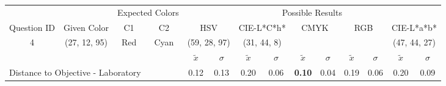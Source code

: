 \begin{table}[H]
  \resizebox{\textwidth}{!} {
  \begin{tabular}{lccccccccccccc}
    \hline
    \multicolumn{1}{c}{}                              &                                      & \multicolumn{2}{c}{Expected Colors}                   & \multicolumn{10}{c}{Possible Results}                                                                                                                                                                                                                                                                                        \\ \cline{3-14}
    \multicolumn{1}{c}{\multirow{-2}{*}{Question ID}} & \multirow{-2}{*}{Given Color}        & C1                       & C2                         & \multicolumn{2}{c}{HSV}                                        & \multicolumn{2}{c}{CIE-L*C*h*}                                 & \multicolumn{2}{c}{CMYK}                                       & \multicolumn{2}{c}{RGB}                                        & \multicolumn{2}{c}{CIE-L*a*b*}                                 \\ \hline
    \multicolumn{1}{c}{4}                             & \cellcolor[HTML]{7F00FF}(27, 12, 95) & \multicolumn{1}{c|}{Red} & \multicolumn{1}{c|}{Cyan}  & \multicolumn{2}{c|}{\cellcolor[HTML]{FF00FF}(59, 28, 97)}      & \multicolumn{2}{c|}{\cellcolor[HTML]{91C01D}(31, 44, 8)}       & \multicolumn{2}{c|}{\cellcolor[HTML]{808080}{\color[HTML]{FFFFFF}(21, 22, 24)}}       & \multicolumn{2}{c|}{\cellcolor[HTML]{808080}{\color[HTML]{FFFFFF}(21, 22, 24)}}       & \multicolumn{2}{c|}{\cellcolor[HTML]{DDA581}(47, 44, 27)}       \\ \hline
                                                      & \multicolumn{1}{l}{}                 & \multicolumn{1}{l}{}     & \multicolumn{1}{l}{}       & \multicolumn{1}{c}{$\tilde{x}$} & \multicolumn{1}{c}{$\sigma$} & \multicolumn{1}{c}{$\tilde{x}$} & \multicolumn{1}{c}{$\sigma$} & \multicolumn{1}{c}{$\tilde{x}$} & \multicolumn{1}{c}{$\sigma$} & \multicolumn{1}{c}{$\tilde{x}$} & \multicolumn{1}{c}{$\sigma$} & \multicolumn{1}{c}{$\tilde{x}$} & \multicolumn{1}{c}{$\sigma$} \\ \hline
    \multicolumn{4}{l}{Distance to Objective - Laboratory}                                                                                           & \multicolumn{1}{|c}{0.12}       & \multicolumn{1}{c|}{0.13}    & \multicolumn{1}{|c}{0.20}       & \multicolumn{1}{c|}{0.06}    & \multicolumn{1}{|c}{\textbf{0.10}}         & \multicolumn{1}{c|}{0.04}    & \multicolumn{1}{|c}{0.19}       & \multicolumn{1}{c|}{0.06}    & \multicolumn{1}{|c}{0.20}       & \multicolumn{1}{c|}{0.09}    \\

\end{tabular}}
\end{table}
